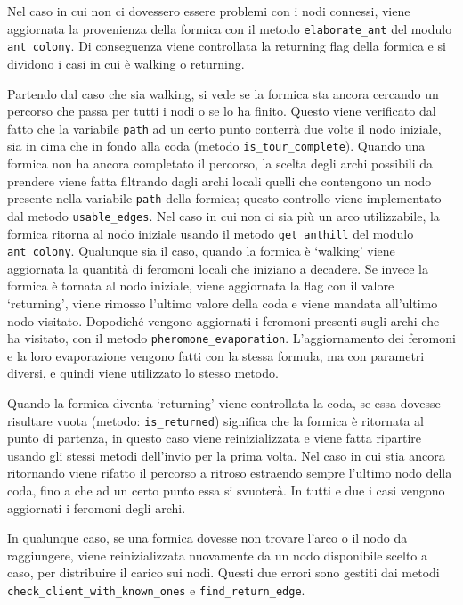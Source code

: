 Nel caso in cui non ci dovessero essere problemi con i nodi connessi, viene aggiornata la provenienza della formica con il metodo \texttt{elaborate\_ant} del modulo \texttt{ant\_colony}.
Di conseguenza viene controllata la returning flag della formica e si dividono i casi in cui è walking o returning. 

Partendo dal caso che sia walking, si vede se la formica sta ancora cercando un percorso che passa per tutti i nodi o se lo ha finito. Questo viene verificato dal fatto che la variabile \texttt{path} ad un certo punto conterrà due volte il nodo iniziale, sia in cima che in fondo alla coda (metodo \texttt{is\_tour\_complete}).
Quando una formica non ha ancora completato il percorso, la scelta degli archi possibili da prendere viene fatta filtrando dagli archi locali quelli che contengono un nodo presente nella variabile \texttt{path} della formica; questo controllo viene implementato dal metodo \texttt{usable\_edges}.
Nel caso in cui non ci sia più un arco utilizzabile, la formica ritorna al nodo iniziale usando il metodo \texttt{get\_anthill} del modulo \texttt{ant\_colony}. Qualunque sia il caso, quando la formica è `walking' viene aggiornata la quantità di feromoni locali che iniziano a decadere.
Se invece la formica è tornata al nodo iniziale, viene aggiornata la flag con il valore `returning', viene rimosso l'ultimo valore della coda e viene mandata all'ultimo nodo visitato. Dopodiché vengono aggiornati i feromoni presenti sugli archi che ha visitato, con il metodo \texttt{pheromone\_evaporation}. 
L'aggiornamento dei feromoni e la loro evaporazione vengono fatti con la stessa formula, ma con parametri diversi, e quindi viene utilizzato lo stesso metodo.

Quando la formica diventa `returning' viene controllata la coda, se essa dovesse risultare vuota (metodo: \texttt{is\_returned}) significa che la formica è ritornata al punto di partenza, in questo caso viene reinizializzata e viene fatta ripartire usando gli stessi metodi dell'invio per la prima volta. 
Nel caso in cui stia ancora ritornando viene rifatto il percorso a ritroso estraendo sempre l'ultimo nodo della coda, fino a che ad un certo punto essa si svuoterà. In tutti e due i casi vengono aggiornati i feromoni degli archi.

In qualunque caso, se una formica dovesse non trovare l'arco o il nodo da raggiungere, viene reinizializzata nuovamente da un nodo disponibile scelto a caso, per distribuire il carico sui nodi. Questi due errori sono gestiti dai metodi \texttt{check\_client\_with\_known\_ones} e \texttt{find\_return\_edge}.

